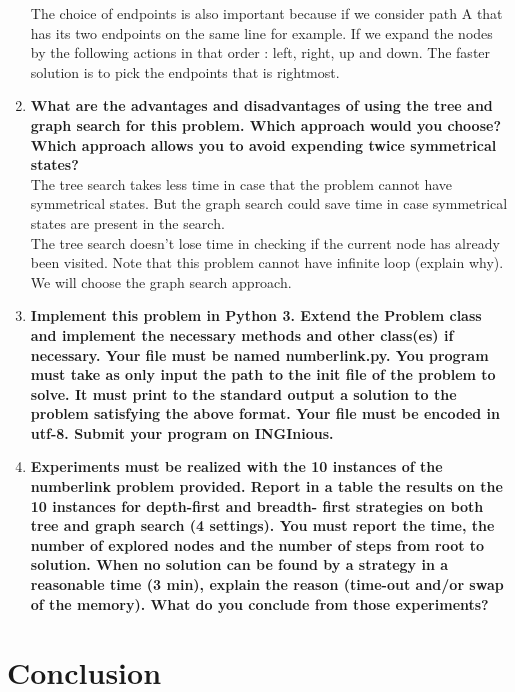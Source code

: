 \documentclass[10pt,a4paper]{article}
\begin{document}
\begin{enumerate}
	The choice of endpoints is also important because if we consider path A that has its two endpoints on the same line for example. If we expand the nodes by the following actions in that order : left, right, up and down. The faster solution is to pick the endpoints that is rightmost.\\
	
	\item \textbf{What are the advantages and disadvantages of using the tree and graph search for this problem. Which approach would you choose? Which approach allows you to avoid expending twice symmetrical states?} \\
	
	The tree search takes less time in case that the problem cannot have symmetrical states. But the graph search could save time in case symmetrical states are present in the search. \\
	
	The tree search doesn't lose time in checking if the current node has already been visited. Note that this problem cannot have infinite loop (explain why). \\
	
	We will choose the graph search approach. 
	
	\item \textbf{Implement this problem in Python 3. Extend the Problem class and implement the necessary methods and other class(es) if necessary. Your file must be named numberlink.py. You program must take as only input the path to the init file of the problem to solve. It must print to the standard output a solution to the problem satisfying the above format. Your file must be encoded in utf-8. Submit your program on INGInious.} \\
	
	\item \textbf{Experiments must be realized with the 10 instances of the numberlink problem provided. Report in a table the results on the 10 instances for depth-first and breadth- first strategies on both tree and graph search (4 settings). You must report the time, the number of explored nodes and the number of steps from root to solution. When no solution can be found by a strategy in a reasonable time (3 min), explain the reason (time-out and/or swap of the memory). What do you conclude from those experiments?} \\
	

\end{enumerate}

\section*{Conclusion}
\end{document}
